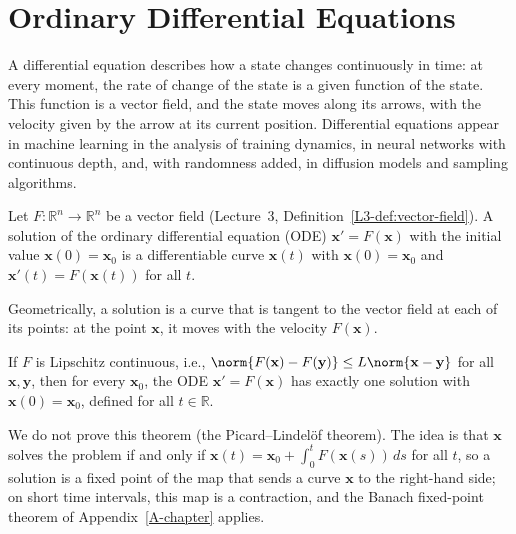 \section{Ordinary Differential Equations}\label{L5-sec:ode}

A differential equation describes how a state changes continuously in time: at every moment, the rate of change of the state is a given function of the state. This function is a vector field, and the state moves along its arrows, with the velocity given by the arrow at its current position. Differential equations appear in machine learning in the analysis of training dynamics, in neural networks with continuous depth, and, with randomness added, in diffusion models and sampling algorithms.

\begin{definition}\label{L5-def:ode}
    Let $F: \mathbb{R}^n \to \mathbb{R}^n$ be a vector field (Lecture~3, Definition~\ref{L3-def:vector-field}). A solution of the ordinary differential equation (ODE) $\mathbf{x}' = F(\mathbf{x})$ with the initial value $\mathbf{x}(0) = \mathbf{x}_0$ is a differentiable curve $\mathbf{x}(t)$ with $\mathbf{x}(0) = \mathbf{x}_0$ and $\mathbf{x}'(t) = F(\mathbf{x}(t))$ for all $t$.
\end{definition}

Geometrically, a solution is a curve that is tangent to the vector field at each of its points: at the point $\mathbf{x}$, it moves with the velocity $F(\mathbf{x})$.

\begin{theorem}\label{L5-thm:picard}
    If $F$ is Lipschitz continuous, i.e., $\norm{F(\mathbf{x}) - F(\mathbf{y})} \leq L\norm{\mathbf{x} - \mathbf{y}}$ for all $\mathbf{x}, \mathbf{y}$, then for every $\mathbf{x}_0$, the ODE $\mathbf{x}' = F(\mathbf{x})$ has exactly one solution with $\mathbf{x}(0) = \mathbf{x}_0$, defined for all $t \in \mathbb{R}$.
\end{theorem}

We do not prove this theorem (the Picard--Lindel\"of theorem). The idea is that $\mathbf{x}$ solves the problem if and only if $\mathbf{x}(t) = \mathbf{x}_0 + \int_0^t F(\mathbf{x}(s))\, ds$ for all $t$, so a solution is a fixed point of the map that sends a curve $\mathbf{x}$ to the right-hand side; on short time intervals, this map is a contraction, and the Banach fixed-point theorem of Appendix~\ref{A-chapter} applies.

